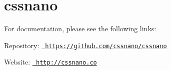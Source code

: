 \chapter{cssnano}
\hypertarget{md_node__modules_2cssnano_2README}{}\label{md_node__modules_2cssnano_2README}
\label{md_node__modules_2cssnano_2README_autotoc_md8894}%
%
 For documentation, please see the following links\+:


\begin{DoxyItemize}
\item Repository\+: \href{https://github.com/cssnano/cssnano}{\texttt{ https\+://github.\+com/cssnano/cssnano}}
\item Website\+: \href{http://cssnano.co}{\texttt{ http\+://cssnano.\+co}} 
\end{DoxyItemize}